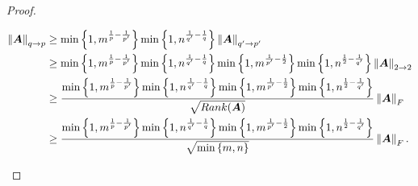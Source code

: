 \begin{proof}
\begin{itemize}
\begin{gather*}
\begin{aligned}
\left\lVert\boldsymbol{A}\right\rVert_{q \to p} &\geq 
\min \left\lbrace 1 , m^{\frac1p - \frac{1}{p'}} \right\rbrace \min \left\lbrace 1 , n^{\frac{1}{q'} - \frac1q} \right\rbrace \left\lVert\boldsymbol{A}\right\rVert_{q' \to p'} \\
&\geq \min \left\lbrace 1 , m^{\frac1p - \frac{1}{p'}} \right\rbrace \min \left\lbrace 1 , n^{\frac{1}{q'} - \frac1q} \right\rbrace \min \left\lbrace 1 , m^{\frac{1}{p'} - \frac12} \right\rbrace \min \left\lbrace 1 , n^{\frac12 - \frac{1}{q'}} \right\rbrace \left\lVert\boldsymbol{A}\right\rVert_{2 \to 2} \\
&\geq \frac{\min \left\lbrace 1 , m^{\frac1p - \frac{1}{p'}} \right\rbrace \min \left\lbrace 1 , n^{\frac{1}{q'} - \frac1q} \right\rbrace \min \left\lbrace 1 , m^{\frac{1}{p'} -\frac12} \right\rbrace \min \left\lbrace 1 , n^{\frac{1}{2} - \frac{1}{q'}} \right\rbrace}{\sqrt{Rank(\boldsymbol{A})}} \left\lVert\boldsymbol{A}\right\rVert_F \\
&\geq \frac{\min \left\lbrace 1 , m^{\frac1p - \frac{1}{p'}} \right\rbrace \min \left\lbrace 1 , n^{\frac{1}{q'} - \frac1q} \right\rbrace \min \left\lbrace 1 , m^{\frac{1}{p'} -\frac12} \right\rbrace \min \left\lbrace 1 , n^{\frac{1}{2} - \frac{1}{q'}} \right\rbrace}{\sqrt{\min \left\lbrace m , n \right\rbrace}} \left\lVert\boldsymbol{A}\right\rVert_F.
\end{aligned}
\end{gather*}


\end{itemize}
\end{proof}
